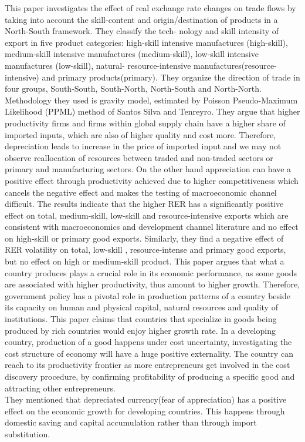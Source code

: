 \documentclass{article}
\begin{document}
\cite{caglayan2019exchange} This paper investigates the effect of real exchange rate changes on trade flows by taking into account the skill-content and origin/destination of products in a North-South framework. They classify the tech- nology and skill intensity of export in five product categories: high-skill intensive manufactures (high-skill), medium-skill intensive manufactures (medium-skill), low-skill intensive manufactures (low-skill), natural- resource-intensive manufactures(resource-intensive) and primary products(primary). They organize the direction of trade in four groups, South-South, South-North, North-South and North-North. Methodology they used is gravity model, estimated by Poisson Pseudo-Maximum Likelihood (PPML) method of Santos Silva and Tenreyro. They argue that higher productivity firms and firms within global supply chain have a higher share of imported inputs, which are also of higher quality and cost more. Therefore, depreciation leads to increase in the price of imported input and we may not observe reallocation of resources between traded and non-traded sectors or primary and manufacturing sectors. On the other hand appreciation can have a positive effect through productivity achieved due to higher competitiveness which cancels the negative effect and makes the testing of macroeconomic channel difficult. The results indicate that the higher RER has a significantly positive effect on total, medium-skill, low-skill and resource-intensive exports which are consistent with macroeconomics and development channel literature and no effect on high-skill or primary good exports. Similarly, they find a negative effect of RER volatility on total, low-skill , resource-intense and primary good exports, but no effect on high or medium-skill product. \cite{hausmann2007you} This paper argues that what a country produces plays a crucial role in its economic performance, as some goods are associated with higher productivity, thus amount to higher growth. Therefore, government policy has a pivotal role in production patterns of a country beside its capacity on human and physical capital, natural resources and quality of institutions. This paper claims that countries that specialize in goods being produced by rich countries would enjoy higher growth rate. In a developing country, production of a good happens under cost uncertainty, investigating the cost structure of economy will have a huge positive externality. The country can reach to its productivity frontier as more entrepreneurs get involved in the cost discovery procedure, by confirming profitability of producing a specific good and attracting other entrepreneurs.\\
\cite{eduardo2007fear}They mentioned that depreciated currency(fear of appreciation) has a positive effect on the economic growth for developing countries. This happens through domestic saving and capital accumulation rather than through import substitution.
\end{document}
